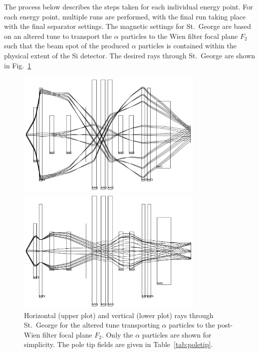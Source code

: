 The process below describes the steps taken for each individual energy
point. For each energy point, multiple runs are performed, with the
final run taking place with the final separator settings. The magnetic
settings for St.\ George are based on an altered tune to transport the
$\alpha$ particles to the Wien filter focal plane $F_2$ such that the
beam spot of the produced $\alpha$ particles is contained within the
physical extent of the Si detector. The desired rays through St.\ George
are shown in Fig.~\ref{fig:raytrace-altered}

\begin{figure}
    \begin{center}
        \centerline{\includegraphics[width=0.8\textwidth]{figures/optimal_tune_x.png}}
        \centerline{\includegraphics[width=0.8\textwidth]{figures/optimal_tune_y.png}}
        \caption[Horizontal and vertical rays through St.\
            George for $\alpha$ particles]{Horizontal (upper plot) and
            vertical (lower plot) rays through St.\ George for the
            altered tune transporting $\alpha$ particles to the
            post-Wien filter focal plane $F_2$. Only the $\alpha$
            particles are shown for simplicity. The pole tip fields are
            given in Table~\ref{tab:poletip}.}
        \label{fig:raytrace-altered}
    \end{center}
\end{figure}

